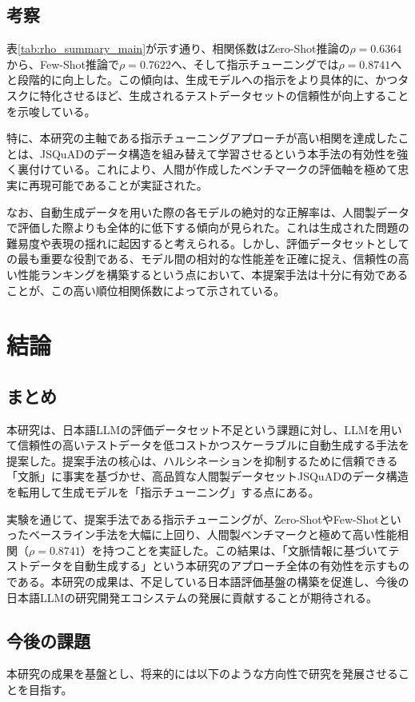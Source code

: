 \documentclass[a4paper,11pt]{jreport}
\begin{document}
\section{考察}
表\ref{tab:rho_summary_main}が示す通り、相関係数はZero-Shot推論の$\rho=0.6364$から、Few-Shot推論で$\rho=0.7622$へ、そして指示チューニングでは$\rho=0.8741$へと段階的に向上した。この傾向は、生成モデルへの指示をより具体的に、かつタスクに特化させるほど、生成されるテストデータセットの信頼性が向上することを示唆している。

特に、本研究の主軸である指示チューニングアプローチが高い相関を達成したことは、JSQuADのデータ構造を組み替えて学習させるという本手法の有効性を強く裏付けている。これにより、人間が作成したベンチマークの評価軸を極めて忠実に再現可能であることが実証された。

なお、自動生成データを用いた際の各モデルの絶対的な正解率は、人間製データで評価した際よりも全体的に低下する傾向が見られた。これは生成された問題の難易度や表現の揺れに起因すると考えられる。しかし、評価データセットとしての最も重要な役割である、モデル間の相対的な性能差を正確に捉え、信頼性の高い性能ランキングを構築するという点において、本提案手法は十分に有効であることが、この高い順位相関係数によって示されている。

\chapter{結論}
\section{まとめ}
本研究は、日本語LLMの評価データセット不足という課題に対し、LLMを用いて信頼性の高いテストデータを低コストかつスケーラブルに自動生成する手法を提案した。提案手法の核心は、ハルシネーションを抑制するために信頼できる「文脈」に事実を基づかせ、高品質な人間製データセットJSQuADのデータ構造を転用して生成モデルを「指示チューニング」する点にある。

実験を通じて、提案手法である指示チューニングが、Zero-ShotやFew-Shotといったベースライン手法を大幅に上回り、人間製ベンチマークと極めて高い性能相関（$\rho = 0.8741$）を持つことを実証した。この結果は、「文脈情報に基づいてテストデータを自動生成する」という本研究のアプローチ全体の有効性を示すものである。本研究の成果は、不足している日本語評価基盤の構築を促進し、今後の日本語LLMの研究開発エコシステムの発展に貢献することが期待される。

\section{今後の課題}
本研究の成果を基盤とし、将来的には以下のような方向性で研究を発展させることを目指す。
\end{document}
